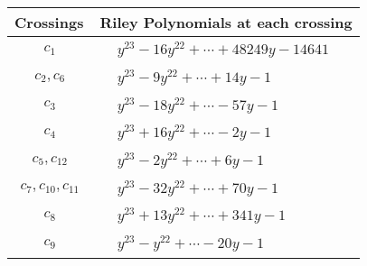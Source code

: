 \documentclass[1p]{elsarticle_modified}
\theoremstyle{definition}
\begin{document}
\begin{tabular}{m{50pt}|m{274pt}}
Crossings & \hspace{64pt}Riley Polynomials at each crossing \\
\hline $$\begin{aligned}c_{1}\end{aligned}$$&$\begin{aligned}
&y^{23}-16 y^{22}+\cdots+48249 y-14641
\end{aligned}$\\
\hline $$\begin{aligned}c_{2},c_{6}\end{aligned}$$&$\begin{aligned}
&y^{23}-9 y^{22}+\cdots+14 y-1
\end{aligned}$\\
\hline $$\begin{aligned}c_{3}\end{aligned}$$&$\begin{aligned}
&y^{23}-18 y^{22}+\cdots-57 y-1
\end{aligned}$\\
\hline $$\begin{aligned}c_{4}\end{aligned}$$&$\begin{aligned}
&y^{23}+16 y^{22}+\cdots-2 y-1
\end{aligned}$\\
\hline $$\begin{aligned}c_{5},c_{12}\end{aligned}$$&$\begin{aligned}
&y^{23}-2 y^{22}+\cdots+6 y-1
\end{aligned}$\\
\hline $$\begin{aligned}c_{7},c_{10},c_{11}\end{aligned}$$&$\begin{aligned}
&y^{23}-32 y^{22}+\cdots+70 y-1
\end{aligned}$\\
\hline $$\begin{aligned}c_{8}\end{aligned}$$&$\begin{aligned}
&y^{23}+13 y^{22}+\cdots+341 y-1
\end{aligned}$\\
\hline $$\begin{aligned}c_{9}\end{aligned}$$&$\begin{aligned}
&y^{23}- y^{22}+\cdots-20 y-1
\end{aligned}$\\
\hline
\end{tabular}\\~\\
\end{document}
